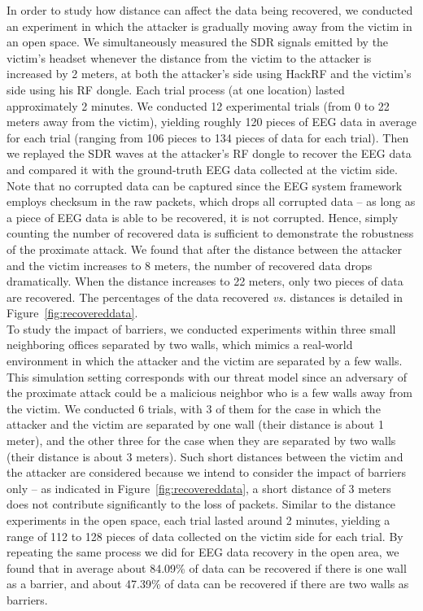 In order to study how distance can affect the data being recovered, we conducted an experiment in which the attacker is gradually moving away from the victim in an open space. We simultaneously measured the SDR signals emitted by the victim's headset whenever the distance from the victim to the attacker is increased by 2 meters, at both the attacker's side using HackRF and the victim's side using his RF dongle. Each trial process (at one location) lasted approximately 2 minutes. We conducted 12 experimental trials (from 0 to 22 meters away from the victim), yielding roughly 120 pieces of EEG data in average for each trial (ranging from 106 pieces to 134 pieces of data for each trial). Then we replayed the SDR waves at the attacker's RF dongle to recover the EEG data and compared it with the ground-truth EEG data collected at the victim side. Note that no corrupted data can be captured since the EEG system framework employs checksum in the raw packets, which drops all corrupted data -- as long as a piece of EEG data is able to be recovered, it is not corrupted. Hence, simply counting the number of recovered data is sufficient to demonstrate the robustness of the proximate attack. We found that after the distance between the attacker and the victim increases to 8 meters, the number of recovered data drops dramatically. When the distance increases to 22 meters, only two pieces of data are recovered. The percentages of the data recovered \emph{vs.} distances is detailed in Figure~\ref{fig:recovereddata}. \\
\indent
To study the impact of barriers, we conducted experiments within three small neighboring offices separated by two walls, which mimics a real-world environment in which the attacker and the victim are separated by a few walls. This simulation setting corresponds with our threat model since an adversary of the proximate attack could be a malicious neighbor who is a few walls away from the victim. We conducted 6 trials, with 3 of them for the case in which the attacker and the victim are separated by one wall (their distance is about 1 meter), and the other three for the case when they are separated by two walls (their distance is about 3 meters). Such short distances between the victim and the attacker are considered because we intend to consider the impact of barriers only -- as indicated in Figure~\ref{fig:recovereddata}, a short distance of 3 meters does not contribute significantly to the loss of packets. Similar to the distance experiments in the open space, each trial lasted around 2 minutes, yielding a range of 112 to 128 pieces of data collected on the victim side for each trial. By repeating the same process we did for EEG data recovery in the open area, we found that in average about 84.09\% of data can be recovered if there is one wall as a barrier, and about 47.39\% of data can be recovered if there are two walls as barriers.

